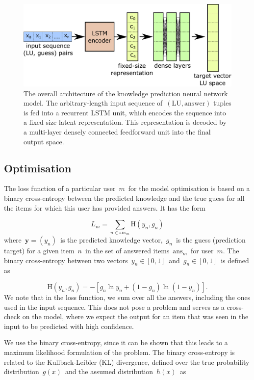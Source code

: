 \begin{figure}[ht]
\centering
\includegraphics[width=0.7\linewidth]{figures/lingvist/network.pdf}
\caption[Overall network architecture]{The overall architecture of the knowledge prediction neural network model. The arbitrary-length input sequence of~$(\mathrm{LU}, \mathrm{answer})$ tuples is fed into a recurrent LSTM unit, which encodes the sequence into a fixed-size latent representation. This representation is decoded by a multi-layer densely connected feedforward unit into the final output space.} 
\label{fig:network} 
\end{figure} 

\subsection{Optimisation}
The loss function of a particular user~$m$~for the model optimisation is based on a binary cross-entropy between the predicted knowledge and the true guess for all the items for which this user has provided answers. It has the form

\begin{equation}
L_m = \sum_{n \in \mathrm{ans}_m} \mathrm{H}(y_n, g_n)
\end{equation}
where~$\mathbf{y} = (y_n)$~is the predicted knowledge vector,~$g_n$~is the guess (prediction target) for a given item~$n$~in the set of answered items~$\mathrm{ans}_m$~for user~$m$. The binary cross-entropy between two vectors~$y_n\in[0,1]$~and~$g_n\in [0,1]$~is defined as

$$\mathrm{H}(y_n, g_n) = -[g_n \ln{y_n} + (1 - g_n)\ln{(1 - y_n)}].$$
We note that in the loss function, we sum over all the answers, including the ones used in the input sequence. This does not pose a problem and serves as a cross-check on the model, where we expect the output for an item that was seen in the input to be predicted with high confidence.

We use the binary cross-entropy, since it can be shown that this leads to a maximum likelihood formulation of the problem. The binary cross-entropy is related to the Kullback-Leibler (KL) divergence, defined over the true probability distribution~$g(x)$~and the assumed distribution~$h(x)$~as

